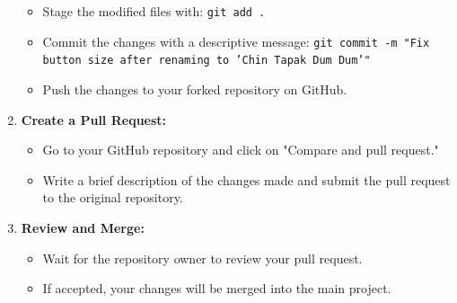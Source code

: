 \documentclass{article}
\begin{document}
\begin{enumerate}[label=\arabic*.]
    \begin{itemize}
        \item Stage the modified files with: \texttt{git add .}
        \item Commit the changes with a descriptive message: \texttt{git commit -m "Fix button size after renaming to 'Chin Tapak Dum Dum'"}
        \item Push the changes to your forked repository on GitHub.
    \end{itemize}
    \item \textbf{Create a Pull Request:}
    \begin{itemize}
        \item Go to your GitHub repository and click on "Compare and pull request."
        \item Write a brief description of the changes made and submit the pull request to the original repository.
    \end{itemize}
    \item \textbf{Review and Merge:}
    \begin{itemize}
        \item Wait for the repository owner to review your pull request.
        \item If accepted, your changes will be merged into the main project.
    \end{itemize}
\end{enumerate}
\end{document}
